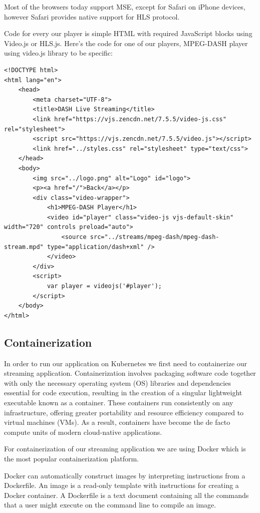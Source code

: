 \documentclass{article}
\begin{document}
Most of the browsers today support MSE, except for Safari on iPhone
devices, however Safari provides native support for HLS protocol.

Code for every our player is simple HTML with required JavaScript blocks
using Video.js or HLS.js. Here's the code for one of our players,
MPEG-DASH player using video.js library to be specific:

\begin{verbatim}
<!DOCTYPE html>
<html lang="en">
	<head>
		<meta charset="UTF-8">
		<title>DASH Live Streaming</title>
		<link href="https://vjs.zencdn.net/7.5.5/video-js.css" rel="stylesheet">
		<script src="https://vjs.zencdn.net/7.5.5/video.js"></script>
		<link href="../styles.css" rel="stylesheet" type="text/css">
	</head>
	<body>
		<img src="../logo.png" alt="Logo" id="logo">
		<p><a href="/">Back</a></p>
		<div class="video-wrapper">
			<h1>MPEG-DASH Player</h1>
			<video id="player" class="video-js vjs-default-skin" width="720" controls preload="auto">
				<source src="../streams/mpeg-dash/mpeg-dash-stream.mpd" type="application/dash+xml" />
			</video>
		</div>
		<script>
			var player = videojs('#player');
		</script>
	</body>
</html>
\end{verbatim}

\subsection{Containerization}\label{containerization}

In order to run our application on Kubernetes we first need to
containerize our streaming application. Containerization involves
packaging software code together with only the necessary operating
system (OS) libraries and dependencies essential for code execution,
resulting in the creation of a singular lightweight executable known as
a container. These containers run consistently on any infrastructure,
offering greater portability and resource efficiency compared to virtual
machines (VMs). As a result, containers have become the de facto compute
units of modern cloud-native applications.

For containerization of our streaming application we are using Docker
which is the most popular containerization platform.

Docker can automatically construct images by interpreting instructions
from a Dockerfile. An image is a read-only template with instructions
for creating a Docker container. A Dockerfile is a text document
containing all the commands that a user might execute on the command
line to compile an image.
\end{document}
